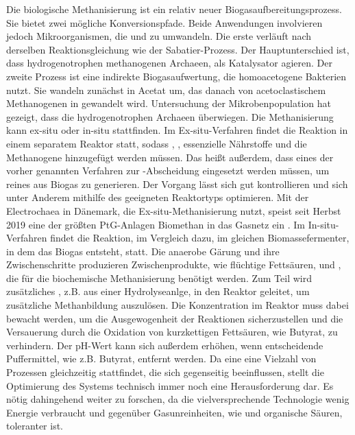 Die biologische Methanisierung ist ein relativ neuer Biogasaufbereitungsprozess. Sie bietet zwei mögliche Konversionspfade. Beide Anwendungen involvieren jedoch Mikroorganismen, die  und  zu  umwandeln. Die erste verläuft nach derselben Reaktionsgleichung wie der Sabatier-Prozess. Der Hauptunterschied ist, dass hydrogenotrophen methanogenen Archaeen, als Katalysator agieren. Der zweite Prozess ist eine indirekte Biogasaufwertung, die homoacetogene Bakterien nutzt. Sie wandeln  zunächst in Acetat um, das danach von acetoclastischem Methanogenen in  gewandelt wird. Untersuchung der Mikrobenpopulation hat gezeigt, dass die hydrogenotrophen Archaeen überwiegen. \parencite{KGKK2019} \parencite{AONC2019} \parencite{VRM2019}
Die Methanisierung kann ex-situ oder in-situ stattfinden. Im Ex-situ-Verfahren findet die Reaktion in einem separatem Reaktor statt, sodass , , essenzielle Nährstoffe und die Methanogene hinzugefügt werden müssen. Das heißt außerdem, dass eines der vorher genannten Verfahren zur -Abscheidung eingesetzt werden müssen, um reines  aus Biogas zu generieren. Der Vorgang lässt sich gut kontrollieren und sich unter Anderem mithilfe des geeigneten Reaktortyps optimieren. Mit der Electrochaea in Dänemark, die Ex-situ-Methanisierung nutzt, speist seit Herbst 2019 eine der größten PtG-Anlagen Biomethan in das Gasnetz ein \parencite{Echae19}.\parencite{KGKK2019} \parencite{AONC2019} \parencite{VRM2019} \newline 
Im In-situ-Verfahren findet die Reaktion, im Vergleich dazu, im gleichen Biomassefermenter, in dem das Biogas entsteht, statt. Die anaerobe Gärung und ihre Zwischenschritte produzieren Zwischenprodukte, wie flüchtige Fettsäuren,  und , die für die biochemische Methanisierung benötigt werden. Zum Teil wird zusätzliches , z.B. aus einer Hydrolyseanlge, in den  Reaktor geleitet, um zusätzliche Methanbildung auszulösen. Die  Konzentration im Reaktor muss dabei bewacht werden, um die Ausgewogenheit der Reaktionen sicherzustellen und die Versauerung durch die Oxidation von kurzkettigen Fettsäuren, wie Butyrat, zu verhindern. Der pH-Wert kann sich außerdem erhöhen, wenn entscheidende Puffermittel, wie z.B. Butyrat, entfernt werden. Da eine eine Vielzahl von Prozessen gleichzeitig stattfindet, die sich gegenseitig beeinflussen, stellt die Optimierung des Systems technisch immer noch eine Herausforderung dar. Es nötig dahingehend weiter zu forschen, da die vielversprechende Technologie wenig Energie verbraucht und gegenüber Gasunreinheiten, wie  und organische Säuren, toleranter ist. 
\parencite{VRM2019} \parencite{KGKK2019} \parencite{AONC2019} \smallskip






